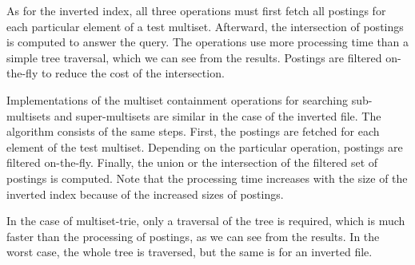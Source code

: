 As for the inverted index, all three operations must first fetch all
postings for each particular element of a test multiset. Afterward,
the intersection of postings is computed to answer the query. The
operations use more processing time than a simple tree traversal,
which we can see from the results. Postings are filtered on-the-fly to
reduce the cost of the intersection.

Implementations of the multiset containment operations
for searching sub-multisets and super-multisets are similar in
the case of the inverted file. The algorithm consists of the same
steps. First, the postings are fetched for each element of the test
multiset. Depending on the particular operation, postings are filtered
on-the-fly. Finally, the union or the intersection of the filtered set
of postings is computed. Note that the processing time increases with
the size of the inverted index because of the increased sizes of
postings.

In the case of multiset-trie, only a traversal of the tree is
required, which is much faster than the processing of postings, as we
can see from the results. In the worst case, the whole tree is
traversed, but the same is for an inverted file.
